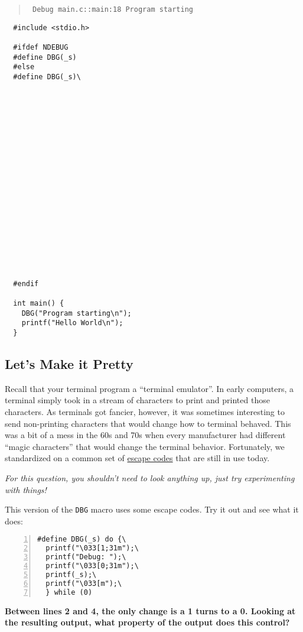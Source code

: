 \documentclass{article}
\begin{document}
\begin{quote}\tt
  Debug main.c::main:18 Program starting
\end{quote}

\bigskip

\begin{lstlisting}
  #include <stdio.h>

  #ifdef NDEBUG
  #define DBG(_s)
  #else
  #define DBG(_s)\




















  #endif

  int main() {
    DBG("Program starting\n");
    printf("Hello World\n");
  }
\end{lstlisting}

\newpage

\subsection{Let's Make it Pretty}

Recall that your terminal program a ``terminal emulator''. In early computers,
a terminal simply took in a stream of characters to print and printed those
characters. As terminals got fancier, however, it was sometimes interesting to
send non-printing characters that would change how to terminal behaved. This
was a bit of a mess in the 60s and 70s when every manufacturer had different
``magic characters'' that would change the terminal behavior. Fortunately, we
standardized on a common set of
\href{https://en.wikipedia.org/wiki/ANSI_escape_code}{escape codes} that are
still in use today.

\emph{For this question, you shouldn't need to look anything up, just try
  experimenting with things!}

This version of the \texttt{DBG} macro uses some escape codes. Try it out and
see what it does:

\begin{lstlisting}[numbers=left]
#define DBG(_s) do {\
  printf("\033[1;31m");\
  printf("Debug: ");\
  printf("\033[0;31m");\
  printf(_s);\
  printf("\033[m");\
  } while (0)
\end{lstlisting}

\textbf{Between lines 2 and 4, the only change is a 1 turns to a 0.
  Looking at the resulting output, what property of the output does this control?}
\vspace{2cm}
\end{document}
